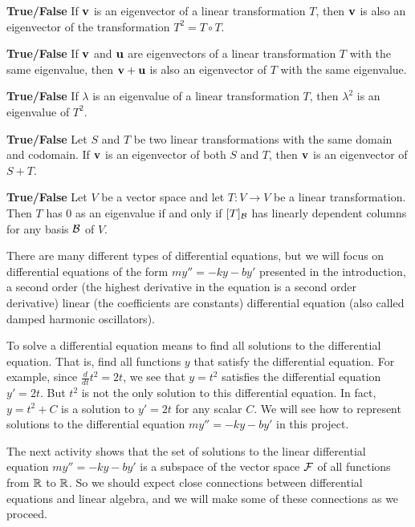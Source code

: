 \item \textbf{True/False} If $\mathbf{v}$ is an eigenvector of a linear transformation $T$, then $\mathbf{v}$ is also an eigenvector of the transformation $T^2 = T \circ T$. 

\item \textbf{True/False} If $\mathbf{v}$ and $\mathbf{u}$ are eigenvectors of a linear transformation $T$ with the same eigenvalue, then $\mathbf{v}+\mathbf{u}$ is also an eigenvector of $T$ with the same eigenvalue.

\item \textbf{True/False} If $\lambda$ is an eigenvalue of a linear transformation $T$, then $\lambda^2$ is an eigenvalue of $T^2$.

\item \textbf{True/False} Let $S$ and $T$ be two linear transformations with the same domain and codomain.  If $\mathbf{v}$ is an eigenvector of both $S$ and $T$, then $\mathbf{v}$ is an eigenvector of $S+T$. 

\item \textbf{True/False} Let $V$ be a vector space and let $T : V \to V$ be a linear transformation. Then $T$ has 0 as an eigenvalue if and only if $[T]_{\mathcal{B}}$ has linearly dependent columns for any basis $\mathcal{B}$ of $V$.

\ea


\ee


There are many different types of differential equations, but we will focus on differential equations of the form $my'' = -ky-by'$ presented in the introduction, a second order (the highest derivative in the equation is a second order derivative) linear (the coefficients are constants) differential equation (also called damped harmonic oscillators).

To solve a differential equation means to find all solutions to the differential equation. That is, find all functions $y$ that satisfy the differential equation. For example, since $\frac{d}{dt} t^2 = 2t$, we see that $y = t^2$ satisfies the differential equation $y' = 2t$. But $t^2$ is not the only solution to this differential equation. In fact, $y = t^2 + C$ is a solution to $y' = 2t$ for any scalar $C$. We will see how to represent solutions to the differential equation $my'' = -ky-by'$ in this project. 

The next activity shows that the set of solutions to the linear differential equation $my'' = -ky-by'$ is a subspace of the vector space $\mathcal{F}$ of all functions from $\mathbb{R}$ to $\mathbb{R}$. So we should expect close connections between differential equations and linear algebra, and we will make some of these connections as we proceed. 


